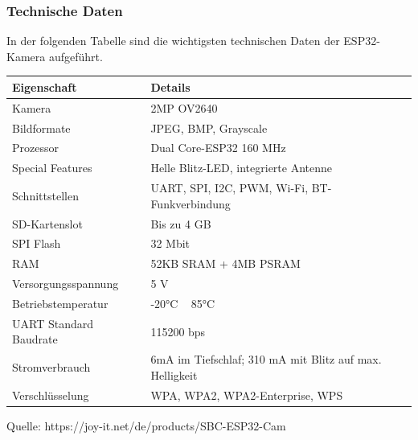 \documentclass[ngerman,12pt,a4paper]{article}
\begin{document}
		\subsubsection{Technische Daten}
		In der folgenden Tabelle sind die wichtigsten technischen Daten der ESP32-Kamera aufgeführt.
		\begin{longtable}{| l | l |}
			\hline
			\textbf{Eigenschaft} & \textbf{Details} \\
			\hline
			Kamera & 2MP OV2640 \\
			\hline
			Bildformate & JPEG, BMP, Grayscale \\
			\hline
			Prozessor & Dual Core-ESP32 160 MHz \\
			\hline
			Special Features & Helle Blitz-LED, integrierte Antenne \\
			\hline
			Schnittstellen & UART, SPI, I2C, PWM, Wi-Fi, BT-Funkverbindung \\
			\hline
			SD-Kartenslot & Bis zu 4 GB \\
			\hline
			SPI Flash & 32 Mbit \\
			\hline
			RAM & 52KB SRAM + 4MB PSRAM \\
			\hline
			Versorgungsspannung & 5 V \\
			\hline
			Betriebstemperatur & -20°C ~ 85°C \\
			\hline
			UART Standard Baudrate & 115200 bps \\
			\hline
			Stromverbrauch & 6mA im Tiefschlaf; 310 mA mit Blitz auf max. Helligkeit \\
			\hline
			Verschlüsselung & WPA, WPA2, WPA2-Enterprise, WPS \\
			\hline
		\end{longtable}
		\vspace{-10pt}
		\noindent 
		\small Quelle: {https://joy-it.net/de/products/SBC-ESP32-Cam}
\end{document}
